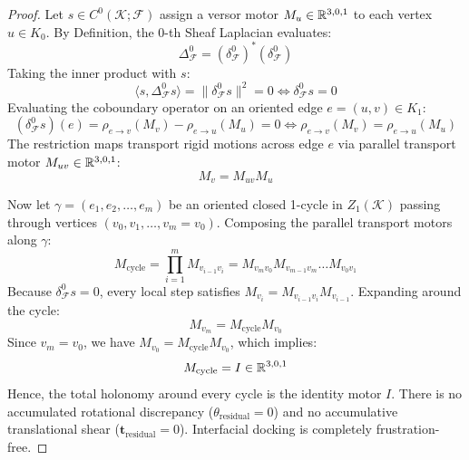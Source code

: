\begin{proof}
Let $s \in C^0(\mathcal{K}; \mathcal{F})$ assign a versor motor $M_u \in \mathbb{R}^{3,0,1}$ to each vertex $u \in K_0$. By Definition, the 0-th Sheaf Laplacian evaluates:
\begin{equation}
    \Delta_{\mathcal{F}}^0 = (\delta_{\mathcal{F}}^0)^* (\delta_{\mathcal{F}}^0)
\end{equation}
Taking the inner product with $s$:
\begin{equation}
    \langle s, \Delta_{\mathcal{F}}^0 s \rangle = \| \delta_{\mathcal{F}}^0 s \|^2 = 0 \iff \delta_{\mathcal{F}}^0 s = 0
\end{equation}
Evaluating the coboundary operator on an oriented edge $e = (u, v) \in K_1$:
\begin{equation}
    (\delta_{\mathcal{F}}^0 s)(e) = \rho_{e \to v}(M_v) - \rho_{e \to u}(M_u) = 0 \iff \rho_{e \to v}(M_v) = \rho_{e \to u}(M_u)
\end{equation}
The restriction maps transport rigid motions across edge $e$ via parallel transport motor $M_{uv} \in \mathbb{R}^{3,0,1}$:
\begin{equation}
    M_v = M_{uv} M_u
\end{equation}

Now let $\gamma = (e_1, e_2, \dots, e_m)$ be an oriented closed 1-cycle in $Z_1(\mathcal{K})$ passing through vertices $(v_0, v_1, \dots, v_m = v_0)$. Composing the parallel transport motors along $\gamma$:
\begin{equation}
    M_{\text{cycle}} = \prod_{i=1}^m M_{v_{i-1} v_i} = M_{v_m v_0} M_{v_{m-1} v_m} \dots M_{v_0 v_1}
\end{equation}
Because $\delta_{\mathcal{F}}^0 s = 0$, every local step satisfies $M_{v_i} = M_{v_{i-1} v_i} M_{v_{i-1}}$. Expanding around the cycle:
\begin{equation}
    M_{v_m} = M_{\text{cycle}} M_{v_0}
\end{equation}
Since $v_m = v_0$, we have $M_{v_0} = M_{\text{cycle}} M_{v_0}$, which implies:
\begin{equation}
    M_{\text{cycle}} = I \in \mathbb{R}^{3,0,1}
\end{equation}
Hence, the total holonomy around every cycle is the identity motor $I$. There is no accumulated rotational discrepancy ($\theta_{\text{residual}} = 0$) and no accumulative translational shear ($\mathbf{t}_{\text{residual}} = 0$). Interfacial docking is completely frustration-free.
\end{proof}

